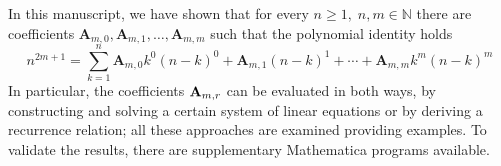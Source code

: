 In this manuscript, we have shown that for every $n\geq 1, \; n,m\in\mathbb{N}$
there are coefficients $\mathbf{A}_{m,0}, \mathbf{A}_{m,1}, \ldots, \mathbf{A}_{m,m}$ such that
the polynomial identity holds
\[
    n^{2m+1} = \sum_{k=1}^{n} \mathbf{A}_{m,0} k^0 (n-k)^0 + \mathbf{A}_{m,1}(n-k)^1
    + \cdots + \mathbf{A}_{m,m} k^m (n-k)^m
\]
In particular, the coefficients ${\mathbf{A}} \sb{m,r}$ can be evaluated in both ways,
by constructing and solving a certain system of linear equations or by deriving a recurrence relation;
all these approaches are examined providing examples.
To validate the results, there are supplementary Mathematica programs available.
